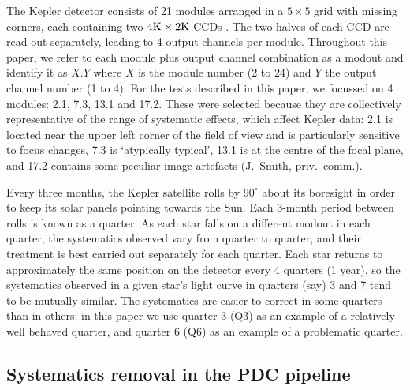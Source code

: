 \documentclass[useAMS,usenatbib]{mn2e}
\begin{document}
The Kepler detector consists of 21 modules arranged in a $5 \times 5$
grid with missing corners, each containing two
$4{\rm K}\times 2 {\rm K}$ CCDs \citep{KeplerInstrumentHandbook}. The two
halves of each CCD are read out separately, leading to 4 output
channels per module. Throughout this paper, we refer to each module
plus output channel combination as a modout and identify it as $X.Y$
where $X$ is the module number (2 to 24) and $Y$ the output channel number (1 to
4). For the tests described in this paper, we focussed on 4 modules: 2.1, 7.3,
13.1 and 17.2. These were selected because they are collectively
representative of the range of systematic effects, which affect Kepler
data: 2.1 is located near the upper left corner of the field of view
and is particularly sensitive to focus changes, 7.3 is `atypically
typical', 13.1 is at the centre of the focal plane, and 17.2 contains
some peculiar image artefacts (J.\ Smith, priv.\ comm.). 

Every three months, the Kepler satellite rolls by $90^{\circ}$ about its boresight
in order to keep its solar panels pointing towards the Sun. Each
3-month period between rolls is known as a quarter. As each star
falls on a different modout in each quarter, the systematics observed
vary from quarter to quarter, and their treatment is best
carried out separately for each quarter. Each star returns to
approximately the same position on the detector every 4 quarters (1
year), so the systematics observed in a given star's light curve in
quarters (say) 3 and 7 tend to be mutually similar. The systematics
are easier to correct in some quarters than in others: in this paper
we use quarter 3 (Q3) as an example of a relatively well behaved quarter,
and quarter 6 (Q6) as an example of a problematic quarter.

\subsection{Systematics removal in the PDC pipeline}
\label{sec:pdc}
\end{document}
